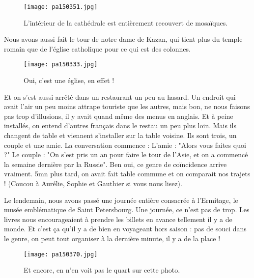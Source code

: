 \documentclass{book}
\begin{document}
\begin{figure}[h]
\centering
\texttt{[image: pa150351.jpg]}
\caption*{ L'intérieur de la cathédrale est entièrement recouvert de mosaïques.}
\end{figure}

Nous avons aussi fait le tour de notre dame de Kazan, qui tient plus du temple romain que de l'église catholique pour ce qui est des colonnes.


\begin{figure}[h]
\centering
\texttt{[image: pa150333.jpg]}
\caption*{ Oui, c'est une église, en effet !}
\end{figure}

Et on s'est aussi arrêté dans un restaurant un peu au hasard. Un endroit qui avait l'air un peu moins attrape touriste que les autres, mais bon, ne nous faisons pas trop d'illusions, il y avait quand même des menus en anglais. Et à peine installés, on entend d'autres français dans le restau un peu plus loin. Mais ils changent de table et viennent s'installer sur la table voisine. Ils sont trois, un couple et une amie. La conversation commence :
L'amie : "Alors vous faites quoi ?"
Le couple : "On s'est pris un an pour faire le tour de l'Asie, et on a commencé la semaine dernière par la Russie".
Ben oui, ce genre de coïncidence arrive vraiment. 5mn plus tard, on avait fait table commune et on comparait nos trajets ! (Coucou à Aurélie, Sophie et Gauthier si vous nous lisez).

Le lendemain, nous avons passé une journée entière consacrée à l'Ermitage, le musée emblématique de Saint Petersbourg. Une journée, ce n'est pas de trop. Les livres nous encourageaient à prendre les billets en avance tellement il y a de monde. Et c'est ça qu'il y a de bien en voyageant hors saison : pas de souci dans le genre, on peut tout organiser à la dernière minute, il y a de la place !


\begin{figure}[h]
\centering
\texttt{[image: pa150370.jpg]}
\caption*{ Et encore, en n'en voit pas le quart sur cette photo.}
\end{figure}
\end{document}
